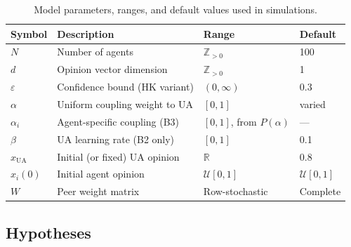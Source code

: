\documentclass{article}
\theoremstyle{plain}
\theoremstyle{definition}
\theoremstyle{remark}
\newcommand{\xUA}{x_{\mathrm{UA}}}
\begin{document}
\begin{table}[h]
\centering
\caption{Model parameters, ranges, and default values used in simulations.}
\label{tab:params}
\vskip 0.15in
\begin{center}
\begin{small}
\begin{tabular}{@{}llll@{}}
\toprule
Symbol & Description & Range & Default \\
\midrule
$N$      & Number of agents                       & $\mathbb{Z}_{>0}$      & 100 \\
$d$      & Opinion vector dimension               & $\mathbb{Z}_{>0}$      & 1   \\
$\varepsilon$ & Confidence bound (HK variant)     & $(0,\infty)$           & 0.3 \\
$\alpha$ & Uniform coupling weight to UA          & $[0,1]$                & varied \\
$\alpha_i$ & Agent-specific coupling (B3)        & $[0,1]$, from $P(\alpha)$ & --- \\
$\beta$  & UA learning rate (B2 only)             & $[0,1]$                & 0.1 \\
$\xUA$   & Initial (or fixed) UA opinion          & $\mathbb{R}$           & 0.8 \\
$x_i(0)$& Initial agent opinion                  & $\mathcal{U}[0,1]$ & $\mathcal{U}[0,1]$ \\
$W$     & Peer weight matrix                      & Row-stochastic         & Complete \\
\bottomrule
\end{tabular}
\end{small}
\end{center}
\vskip -0.1in
\end{table}

\subsection{Hypotheses}
\end{document}

